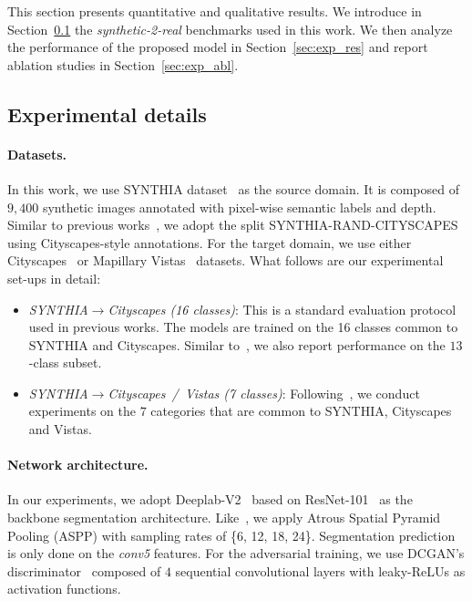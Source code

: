 \documentclass[10pt,twocolumn,letterpaper]{article}
\begin{document}
This section presents quantitative and qualitative results. 
We introduce in Section~\ref{sec:exp_details} the \textit{synthetic-2-real} benchmarks used in this work.
We then analyze the performance of the proposed model in Section~\ref{sec:exp_res} and report ablation studies in Section~\ref{sec:exp_abl}.

\subsection{Experimental details}
\label{sec:exp_details}

\paragraph{Datasets.}
In this work, we use SYNTHIA dataset~\cite{Ros_2016_CVPR} as the source domain.
It is composed of $9,400$ synthetic images annotated with pixel-wise semantic labels and depth.
Similar to previous works~\cite{lee2018spigan, tsai2018learning, vu2018advent}, we adopt the split SYNTHIA-RAND-CITYSCAPES using Cityscapes-style annotations.
For the target domain, we use either Cityscapes~\cite{cordts2016cityscapes} or Mapillary Vistas~\cite{MVD2017} datasets.
What follows are our experimental set-ups in detail:
\begin{itemize}
	\item \textit{SYNTHIA$\rightarrow$Cityscapes (16 classes)}: This is a standard evaluation protocol used in previous works. The models are trained on the 16 classes common to SYNTHIA and Cityscapes. Similar to~\cite{tsai2018learning, vu2018advent}, we also report performance on the $13$-class subset.
	\item \textit{SYNTHIA$\rightarrow$Cityscapes~/~Vistas (7 classes)}: Following~\cite{lee2018spigan}, we conduct experiments on the $7$ categories that are common to SYNTHIA, Cityscapes and Vistas.
\end{itemize}
\paragraph{Network architecture.}
In our experiments, we adopt Deeplab-V2~\cite{chen2018deeplab} based on ResNet-101~\cite{He2015} as the backbone segmentation architecture.
Like~\cite{tsai2018learning, vu2018advent}, we apply Atrous Spatial Pyramid Pooling (ASPP) with sampling rates of \{6, 12, 18, 24\}.
Segmentation prediction is only done on the \textit{conv5} features.
For the adversarial training, we use DCGAN's discriminator~\cite{radford2015unsupervised} composed of $4$ sequential convolutional layers with leaky-ReLUs as activation functions.
\end{document}
